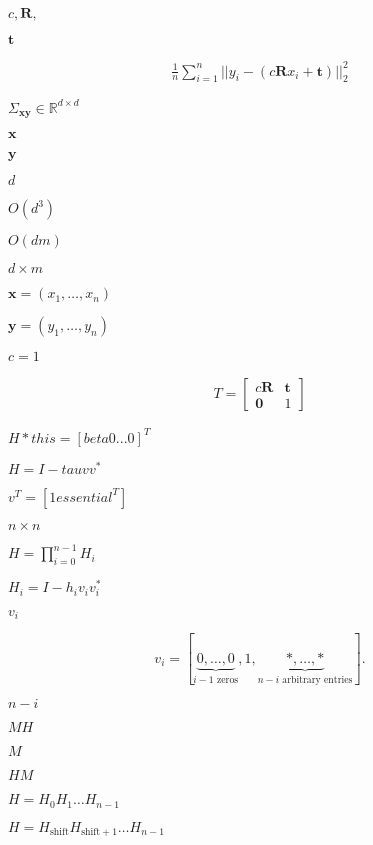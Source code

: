 \documentclass{article}
\begin{document}
$ c, \mathbf{R}, $
\pagebreak

$ \mathbf{t} $
\pagebreak

\begin{align*}
  \frac{1}{n} \sum_{i=1}^n \vert\vert y_i - (c\mathbf{R}x_i + \mathbf{t}) \vert\vert_2^2
\end{align*}
\pagebreak

$ \Sigma_{\mathbf{x}\mathbf{y}} \in \mathbb{R}^{d \times d} $
\pagebreak

$ \mathbf{x} $
\pagebreak

$ \mathbf{y} $
\pagebreak

$d$
\pagebreak

$O(d^3)$
\pagebreak

$O(dm)$
\pagebreak

$d \times m$
\pagebreak

$ \mathbf{x} = \left( x_1, \hdots, x_n \right) $
\pagebreak

$ \mathbf{y} = \left( y_1, \hdots, y_n \right) $
\pagebreak

$ c=1 $
\pagebreak

\begin{align*}
  T = \begin{bmatrix} c\mathbf{R} & \mathbf{t} \\ \mathbf{0} & 1 \end{bmatrix}
\end{align*}
\pagebreak

$ H *this = [ beta 0 ... 0]^T $
\pagebreak

$ H = I - tau v v^*$
\pagebreak

$ v^T = [1 essential^T] $
\pagebreak

$ n \times n $
\pagebreak

$ H = \prod_{i=0}^{n-1} H_i $
\pagebreak

$ H_i = I - h_i v_i
v_i^* $
\pagebreak

$
v_i $
\pagebreak

\[
v_i = [\underbrace{0, \ldots, 0}_{i-1\mbox{ zeros}}, 1, \underbrace{*, \ldots,*}_{n-i\mbox{ arbitrary entries}} ].
\]
\pagebreak

$ n-i $
\pagebreak

$ MH $
\pagebreak

$ M $
\pagebreak

$ HM $
\pagebreak

$ H = H_0 H_1 \ldots H_{n-1} $
\pagebreak

$ H = H_{\mathrm{shift}}
H_{\mathrm{shift}+1} \ldots H_{n-1} $
\pagebreak
\end{document}

